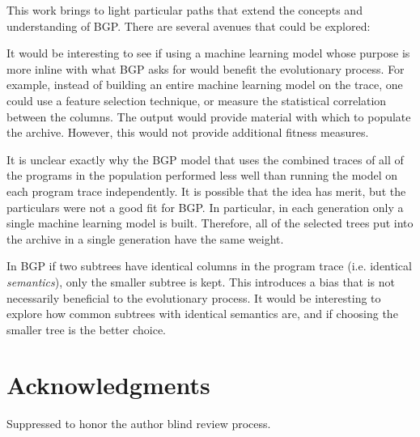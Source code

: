 This work brings to light particular paths that extend the concepts and understanding of BGP.  There are several avenues that could be explored:
\begin{inparaenum}
\item  
It would be interesting to see if using a machine learning model whose purpose is more inline with what BGP asks for would benefit the evolutionary process.  For example, instead of building an entire machine learning model on the trace, one could use a feature selection technique, or measure the statistical correlation between the columns.  The output would provide material with which to populate the archive.  However, this would not provide additional fitness measures.

\item
It is unclear exactly why the BGP model that uses the combined traces of all of the programs in the population performed less well than running the model on each program trace independently.  It is possible that the idea has merit, but the particulars were not a good fit for BGP.  In particular, in each generation only a single machine learning model is built.  Therefore, all of the selected trees put into the archive in a single generation have the same weight.

\item
In BGP if two subtrees have identical columns in the program trace (i.e. identical \textit{semantics}), only the smaller subtree is kept.  This introduces a bias that is not necessarily beneficial to the evolutionary process.  It would be interesting to explore how common subtrees with identical semantics are, and if choosing the smaller tree is the better choice.
\end{inparaenum}

\section*{Acknowledgments} Suppressed to honor the author blind review process.
